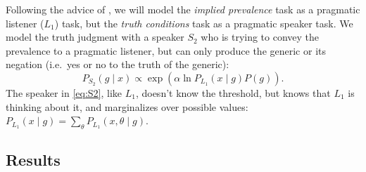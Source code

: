 \documentclass[10pt,letterpaper]{article}
\begin{document}
Following the advice of , we will model the \emph{implied prevalence} task as a pragmatic listener ($L_{1}$) task, but the \emph{truth conditions} task as a pragmatic speaker task. We model the truth judgment with a speaker $S_{2}$ who is trying to convey the prevalence to a pragmatic listener, but can only produce the generic or its negation (i.e.~yes or no to the truth of the generic):
\begin{equation} 
P_{S_{2}}(g \mid x) \propto \exp{(\alpha \ln{P_{L_{1}}(x \mid g) P(g)})}.
\label{eq:S2}
\end{equation}
The speaker in \eqref{eq:S2}, like $L_{1}$, doesn't know the threshold, but knows that $L_{1}$ is thinking about it, and marginalizes over possible values: $ P_{L_{1}}(x \mid g) = \sum_{\theta} P_{L_{1}}(x , \theta \mid g) $.


%			
%			




%	
%			
%			
%	
%				
%				


\subsection{Results}
\end{document}
